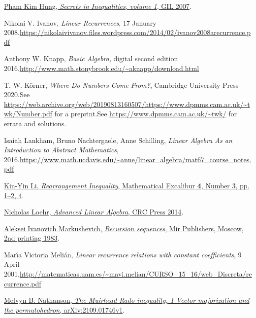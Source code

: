 \documentclass[numbers=enddot,12pt,final,onecolumn,notitlepage]{scrartcl}%
\numberwithin{exer}{subsection}
\theoremstyle{definition}
\begin{document}
\begin{thebibliography}{99999999}
%
\href{http://refkol.ro/matek/mathbooks/!Books!/Secrets in Inequalities (volume 1) Pham Kim Hung.pdf}{Pham
Kim Hung, \textit{Secrets in Inequalities, volume 1}, GIL 2007}.

Nikolai V. Ivanov, \textit{Linear Recurrences}, 17
January 2008.\newline\url{https://nikolaivivanov.files.wordpress.com/2014/02/ivanov2008arecurrence.pdf}

Anthony W. Knapp, \textit{Basic Algebra}, digital
second edition 2016.\newline\url{http://www.math.stonybrook.edu/~aknapp/download.html}

T. W. K\"{o}rner, \textit{Where Do Numbers Come
From?}, Cambridge University Press 2020.\newline See
\url{https://web.archive.org/web/20190813160507/https://www.dpmms.cam.ac.uk/~twk/Number.pdf}
for a preprint.\newline See \url{https://www.dpmms.cam.ac.uk/~twk/} for errata
and solutions.

Isaiah Lankham, Bruno Nachtergaele, Anne
Schilling, \textit{Linear Algebra As an Introduction to Abstract Mathematics},
2016.\newline\url{https://www.math.ucdavis.edu/~anne/linear_algebra/mat67_course_notes.pdf}

%
\href{https://www.math.hkust.edu.hk/excalibur/v4_n3.pdf}{Kin-Yin Li,
\textit{Rearrangement Inequality}, Mathematical Excalibur \textbf{4}, Number
3, pp. 1--2, 4}.

%
\href{https://elblogdecontar.files.wordpress.com/2017/01/ebookdaraz-advanced-linear-algebra.pdf}{Nicholas
Loehr, \textit{Advanced Linear Algebra}, CRC Press 2014}.

%
\href{https://archive.org/details/recursion-sequences}{Aleksei Ivanovich
Markushevich, \textit{Recursion sequences}, Mir Publishers, Moscow, 2nd
printing 1983}.

Mar\'{\i}a Victoria Meli\'{a}n, \textit{Linear
recurrence relations with constant coefficients}, 9 April 2001.\newline\url{http://matematicas.uam.es/~mavi.melian/CURSO_15_16/web_Discreta/recurrence.pdf}

\href{https://arxiv.org/abs/2109.01746v1}{Melvyn
B. Nathanson, \textit{The Muirhead-Rado inequality, 1 Vector majorization and
the permutohedron}, arXiv:2109.01746v1}.


\end{thebibliography}
\end{document}

